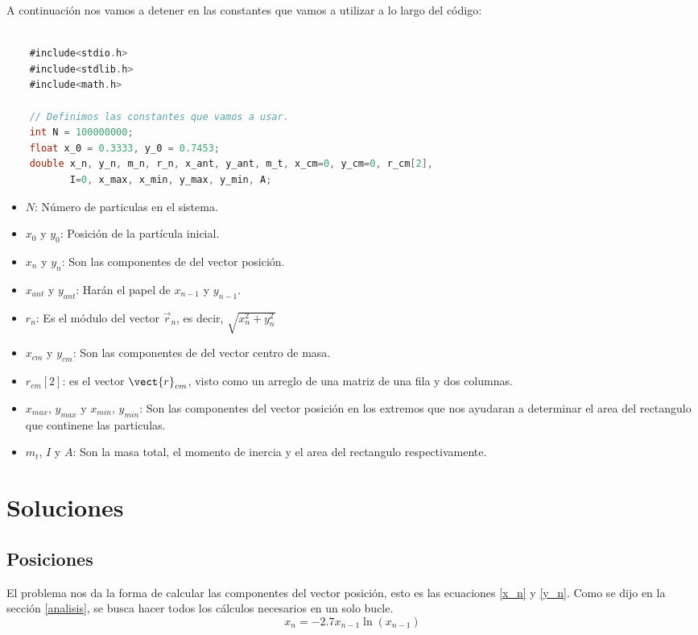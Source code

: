 \documentclass[12pt]{article}
\begin{document}
A continuación nos vamos a detener en las constantes que vamos a utilizar a lo largo del código:

\begin{lstlisting}[language=C, caption={Declaraciòn de Variables}, style=mystyle]

    #include<stdio.h>
    #include<stdlib.h>
    #include<math.h>
    
    // Definimos las constantes que vamos a usar.
    int N = 100000000;
    float x_0 = 0.3333, y_0 = 0.7453;
    double x_n, y_n, m_n, r_n, x_ant, y_ant, m_t, x_cm=0, y_cm=0, r_cm[2],
           I=0, x_max, x_min, y_max, y_min, A;
    \end{lstlisting}

\begin{itemize}
    \item $N$: Número de particulas en el sistema.
    \item $x_0$ y $y_0$: Posición de la partícula inicial. 
    \item $x_n$ y $y_n$: Son las componentes de del vector posición.
    \item $x_{ant}$ y $y_{ant}$: Harán el papel de $x_{n-1}$ y $y_{n-1}$.
    \item $r_n$: Es el módulo del vector $\vec{r}_n$, es decir, $\sqrt{ x^2_n + y^2_n}$
    \item $x_{cm}$ y $y_{cm}$: Son las componentes de del vector centro de masa.
    \item $r_{cm}[2]$: es el vector $\vect{r}_{cm}$, visto como un arreglo de una matriz de una fila y dos columnas.
    \item $x_{max}$, $y_{max}$ y $x_{min}$, $y_{min} $: Son las componentes del vector posición en los extremos que nos ayudaran a determinar el area del rectangulo que continene las particulas.
    \item $m_t$, $I$ y $A$: Son la masa total, el momento de inercia y el area del rectangulo respectivamente.
\end{itemize}


\section{Soluciones}

\subsection{Posiciones}

El problema nos da la forma de calcular las componentes del vector posición, esto es las ecuaciones \ref{x_n} y \ref{y_n}. Como se dijo en la sección \ref{analisis}, se busca hacer todos
los cálculos necesarios en un solo bucle. 
\begin{equation}
    \label{x_n}
    x_n = -2.7 x_{n-1} \ln(x_{n-1})
\end{equation}
\end{document}
